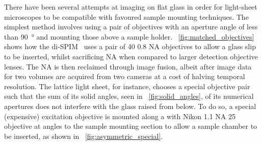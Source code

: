 There have been several attempts at imaging on flat glass in order for light-sheet microscopes to be compatible with favoured sample mounting techniques.
The simplest method involves using a pair of objectives with an aperture angle of less than \SI{90}{\degree} and mounting those above a sample holder.
\figurename~\ref{fig:matched_objectives} shows how the di-SPIM~\cite{kumar_using_2016} uses a pair of \SI{40}{\times} 0.8 \gls{NA} objectives to allow a glass slip to be inserted, whilst sacrificing \gls{NA} when compared to larger detection objective lenses.
The \gls{NA} is then reclaimed through image fusion, albeit after image data for two volumes are acquired from two cameras at a cost of halving temporal resolution.
The lattice light sheet\cite{chen_lattice_2014}, for instance, chooses a special objective pair such that the sum of its solid angles, seen in \figurename~\ref{fig:solid_angles}, of its numerical apertures does not interfere with the glass raised from below.
To do so, a special (expensive) excitation objective is mounted along a with Nikon 1.1 NA \SI{25}{\times} objective at angles to the sample mounting section to allow a sample chamber to be inserted, as shown in \figurename~\ref{fig:asymmetric_special}.

